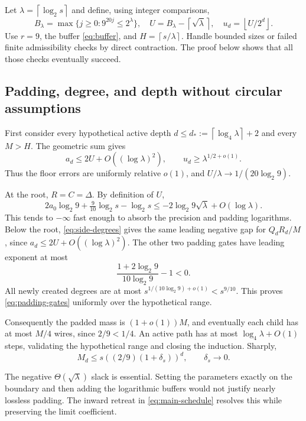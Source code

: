 \documentclass[11pt]{article}
\theoremstyle{definition}\newtheorem{definition}[theorem]{Definition}
\theoremstyle{remark}\newtheorem{remark}[theorem]{Remark}
\newcommand{\floor}[1]{\left\lfloor#1\right\rfloor}
\newcommand{\ceil}[1]{\left\lceil#1\right\rceil}
\begin{document}
Let $\lambda=\ceil{\log_2s}$ and define, using integer comparisons,
\begin{equation}
 B_\lambda=\max\{j\ge0:9^{20j}\le2^\lambda\},\quad
 U=B_\lambda-\ceil{\sqrt\lambda},\quad
 u_d=\floor{U/2^d}.\label{eq:main-schedule}
\end{equation}
Use $r=9$, the buffer \eqref{eq:buffer}, and $H=\ceil{s/\lambda}$.
Handle bounded sizes or failed finite admissibility checks by direct
contraction. The proof below shows that all those checks eventually succeed.

\subsection{Padding, degree, and depth without circular assumptions}

First consider every hypothetical active depth
$d\le d_*:=\ceil{\log_4\lambda}+2$ and every $M>H$.
The geometric sum gives
\[
 a_d\le2U+O((\log\lambda)^2),\qquad
 u_d\ge\lambda^{1/2+o(1)}.
\]
Thus the floor errors are uniformly relative $o(1)$, and
$U/\lambda\to1/(20\log_2 9)$.

At the root, $R=C=\Delta$. By definition of $U$,
\[
 2a_0\log_2 9+\tfrac9{10}\log_2s-\log_2s
 \le-2\log_2 9\sqrt\lambda+O(\log\lambda).
\]
This tends to $-\infty$ fast enough to absorb the precision and padding
logarithms. Below the root, \eqref{eq:side-degrees} gives the same leading
negative gap for $Q_dR_d/M$, since $a_d\le2U+O((\log\lambda)^2)$.
The other two padding gates have leading exponent at most
\[
 \frac{1+2\log_2 9}{10\log_2 9}-1<0.
\]
All newly created degrees are at most
$s^{1/(10\log_2 9)+o(1)}<s^{9/10}$. This proves
\eqref{eq:padding-gates} uniformly over the hypothetical range.

Consequently the padded mass is $(1+o(1))M$, and eventually each child has
at most $M/4$ wires, since $2/9<1/4$. An active path has at most
$\log_4\lambda+O(1)$ steps, validating the hypothetical range and closing
the induction. Sharply,
\begin{equation}
 M_d\le s\left((2/9)(1+\delta_s)\right)^d,
 \qquad\delta_s\longrightarrow0.\label{eq:sharp-child}
\end{equation}

The negative $\Theta(\sqrt\lambda)$ slack is essential. Setting the
parameters exactly on the boundary and then adding the logarithmic buffers
would not justify nearly lossless padding. The inward retreat in
\eqref{eq:main-schedule} resolves this while preserving the limit coefficient.
\end{document}
